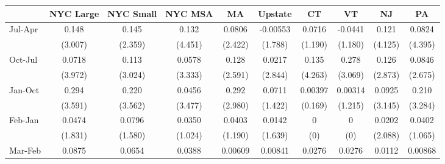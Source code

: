 {
\def\sym#1{\ifmmode^{#1}\else\(^{#1}\)\fi}
\begin{tabular}{l*{9}{c}}
\hline\hline
                    &\multicolumn{1}{c}{NYC Large}&\multicolumn{1}{c}{NYC Small}&\multicolumn{1}{c}{NYC MSA}&\multicolumn{1}{c}{MA}&\multicolumn{1}{c}{Upstate}&\multicolumn{1}{c}{CT}&\multicolumn{1}{c}{VT}&\multicolumn{1}{c}{NJ}&\multicolumn{1}{c}{PA}\\
\hline
Jul-Apr             &       0.148         &       0.145         &       0.132         &      0.0806         &    -0.00553         &      0.0716         &     -0.0441         &       0.121         &      0.0824         \\
                    &     (3.007)         &     (2.359)         &     (4.451)         &     (2.422)         &     (1.788)         &     (1.190)         &     (1.180)         &     (4.125)         &     (4.395)         \\
[1em]
Oct-Jul             &      0.0718         &       0.113         &      0.0578         &       0.128         &      0.0217         &       0.135         &       0.278         &       0.126         &      0.0846         \\
                    &     (3.972)         &     (3.024)         &     (3.333)         &     (2.591)         &     (2.844)         &     (4.263)         &     (3.069)         &     (2.873)         &     (2.675)         \\
[1em]
Jan-Oct             &       0.294         &       0.220         &      0.0456         &       0.292         &      0.0711         &     0.00397         &     0.00314         &      0.0925         &       0.210         \\
                    &     (3.591)         &     (3.562)         &     (3.477)         &     (2.980)         &     (1.422)         &     (0.169)         &     (1.215)         &     (3.145)         &     (3.284)         \\
[1em]
Feb-Jan             &      0.0474         &      0.0796         &      0.0350         &      0.0403         &      0.0142         &           0         &           0         &      0.0202         &      0.0402         \\
                    &     (1.831)         &     (1.580)         &     (1.024)         &     (1.190)         &     (1.639)         &         (0)         &         (0)         &     (2.088)         &     (1.065)         \\
[1em]
Mar-Feb             &      0.0875         &      0.0654         &      0.0388         &     0.00609         &     0.00841         &      0.0276         &      0.0276         &      0.0112         &     0.00868         \\

\end{tabular}}
